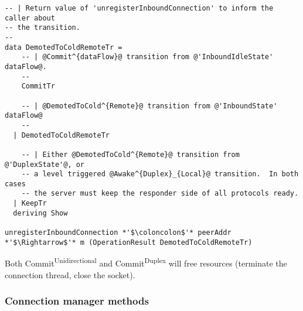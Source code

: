 \documentclass{article}
\def\CommitDup{\textsf{Commit}\textsuperscript{\textsf{Duplex}}}
\def\CommitUni{\textsf{Commit}\textsuperscript{\textsf{Unidirectional}}}
\begin{document}
\begin{lstlisting}
-- | Return value of 'unregisterInboundConnection' to inform the caller about
-- the transition.
--
data DemotedToColdRemoteTr =
    -- | @Commit^{dataFlow}@ transition from @'InboundIdleState' dataFlow@.
    --
    CommitTr

    -- | @DemotedToCold^{Remote}@ transition from @'InboundState' dataFlow@
    --
  | DemotedToColdRemoteTr

    -- | Either @DemotedToCold^{Remote}@ transition from @'DuplexState'@, or
    -- a level triggered @Awake^{Duplex}_{Local}@ transition.  In both cases
    -- the server must keep the responder side of all protocols ready.
  | KeepTr
  deriving Show

unregisterInboundConnection *'$\coloncolon$'* peerAddr *'$\Rightarrow$'* m (OperationResult DemotedToColdRemoteTr)
\end{lstlisting}
Both \CommitUni{} and \CommitDup{} will free resources (terminate the
connection thread, close the socket).


\subsubsection{Connection manager methods}
\end{document}
